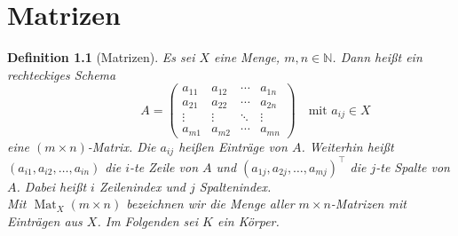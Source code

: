\documentclass{report}
\newcommand{\IN}[1]{\index{#1|BH}}
\newcommand{\N}{\mathbb{N}}
\DeclareMathOperator{\Mat}{Mat}
\theoremstyle{customrem}
\theoremstyle{customdef}
\newtheorem{definition}{Definition}[chapter]
\begin{document}
\chapter{Matrizen}

	\begin{definition}[Matrizen]
		\IN{Matrix}
		Es sei $X$ eine Menge, $m,n\in\N$. Dann heißt ein rechteckiges Schema 
		$$\qquad\qquad A=
		\begin{pmatrix}
			a_{11} & a_{12} & \cdots & a_{1n}\\
			a_{21} & a_{22} & \cdots & a_{2n}\\
			\vdots & \vdots	& \ddots& \vdots\\
			a_{m1} & a_{m2} &\cdots & a_{mn}
			\end{pmatrix}
			\quad\text{mit $a_{ij}\in X$}
		$$
		eine $(m\times n)$-\textsl{Matrix}. Die $a_{ij}$ heißen Einträge von $A$. Weiterhin heißt $(a_{i1}, a_{i2}, \ldots, a_{in})$ die $i$-te Zeile von $A$ und $(a_{1j}, a_{2j}, \ldots, a_{mj})^\top$ die $j$-te Spalte von $A$. Dabei heißt $i$ Zeilenindex und $j$ Spaltenindex.\\
		
		 Mit $\Mat_X(m\times n)$ bezeichnen wir die Menge aller $m\times n$-Matrizen mit Einträgen aus $X$. Im Folgenden sei $K$ ein Körper.
	\end{definition}
	    
\end{document}
